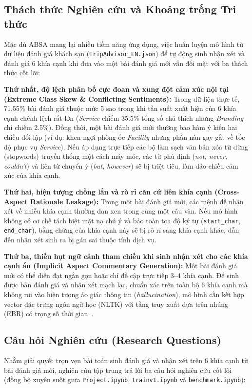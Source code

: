 \documentclass[pdflatex,sn-mathphys-num]{sn-jnl}
\theoremstyle{thmstyleone}
\theoremstyle{thmstyletwo}
\theoremstyle{thmstylethree}
\begin{document}
\subsection{Thách thức Nghiên cứu và Khoảng trống Tri thức}
\label{subsec:problem}
Mặc dù ABSA mang lại nhiều tiềm năng ứng dụng, việc huấn luyện mô hình từ dữ liệu đánh giá khách sạn (\texttt{TripAdvisor\_EN.json}) để tự động sinh nhận xét và đánh giá 6 khía cạnh khi đưa vào một bài đánh giá mới vẫn đối mặt với ba thách thức cốt lõi:

\textbf{Thứ nhất, độ lệch phân bố cực đoan và xung đột cảm xúc nội tại (Extreme Class Skew \& Conflicting Sentiments):} Trong dữ liệu thực tế, 71.55\% bài đánh giá thuộc mức 5 sao trong khi tần suất xuất hiện của 6 khía cạnh chênh lệch rất lớn (\textit{Service} chiếm 35.5\% tổng số chú thích nhưng \textit{Branding} chỉ chiếm 2.5\%). Đồng thời, một bài đánh giá mới thường bao hàm ý kiến hai chiều đối lập (ví dụ: khen ngợi phòng ốc \textit{Facility} nhưng phàn nàn gay gắt về tốc độ phục vụ \textit{Service}). Nếu áp dụng trực tiếp các bộ làm sạch văn bản xóa từ dừng (stopwords) truyền thống một cách máy móc, các từ phủ định (\textit{not, never, couldn't}) và liên từ chuyển ý (\textit{but, however}) sẽ bị triệt tiêu, làm đảo chiều cảm xúc của khía cạnh.

\textbf{Thứ hai, hiện tượng chồng lấn và rò rỉ căn cứ liên khía cạnh (Cross-Aspect Rationale Leakage):} Trong một bài đánh giá mới, các mệnh đề nhận xét về nhiều khía cạnh thường đan xen trong cùng một câu văn. Nếu mô hình không có cơ chế tách biệt mặt nạ chú ý và bảo toàn tọa độ ký tự (\texttt{start\_char}, \texttt{end\_char}), bằng chứng của khía cạnh này sẽ bị rò rỉ sang khía cạnh khác, dẫn đến nhận xét sinh ra bị gán sai thuộc tính dịch vụ.

\textbf{Thứ ba, thiếu hụt ngữ cảnh tham chiếu khi sinh nhận xét cho các khía cạnh ẩn (Implicit Aspect Commentary Generation):} Một bài đánh giá mới có thể diễn đạt ngắn gọn hoặc chỉ đề cập trực tiếp 3--4 khía cạnh. Để sinh được bản đánh giá và nhận xét mạch lạc, chuẩn xác trên toàn bộ 6 khía cạnh mà không rơi vào hiện tượng ảo giác thông tin (\textit{hallucination}), mô hình cần kết hợp vector đặc trưng ngôn ngữ học (NLTK) với tầng truy xuất dựa trên nhúng (EBR) có trọng số thời gian~\cite{yu2024dynamic}.


\subsection{Câu hỏi Nghiên cứu (Research Questions)}
\label{subsec:research_questions}
Nhằm giải quyết trọn vẹn bài toán sinh đánh giá và nhận xét trên 6 khía cạnh từ bài đánh giá mới, nghiên cứu tập trung trả lời ba câu hỏi nghiên cứu cốt lõi (đồng bộ xuyên suốt giữa \texttt{Project.ipynb}, \texttt{trainv1.ipynb} và \texttt{benchmark.ipynb}):
\end{document}

